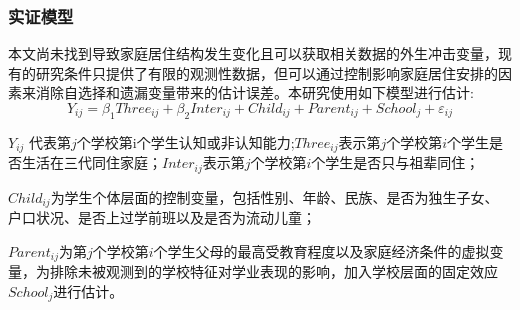 \documentclass{beamer}
\begin{document}
\begin{frame}
	\frametitle{实证模型}
	本文尚未找到导致家庭居住结构发生变化且可以获取相关数据的外生冲击变量，现有的研究条件只提供了有限的观测性数据，但可以通过控制影响家庭居住安排的因素来消除自选择和遗漏变量带来的估计误差。本研究使用如下模型进行估计:
\begin{equation}
	Y_{ij}=\beta_1Three_{ij}+\beta_2Inter_{ij}+Child_{ij}+Parent_{ij}+School_j+\varepsilon_{ij}
\end{equation}
\par $Y_{ij}$ 代表第$j$个学校第i个学生认知或非认知能力;$Three_{ij}$表示第$j$个学校第$i$个学生是否生活在三代同住家庭；$Inter_{ij}$表示第$j$个学校第$i$个学生是否只与祖辈同住；
\par $Child_{ij}$为学生个体层面的控制变量，包括性别、年龄、民族、是否为独生子女、户口状况、是否上过学前班以及是否为流动儿童；
\par $Parent_{ij}$为第$j$个学校第$i$个学生父母的最高受教育程度以及家庭经济条件的虚拟变量，为排除未被观测到的学校特征对学业表现的影响，加入学校层面的固定效应$School_j$进行估计。 
\end{frame}
\end{document}
